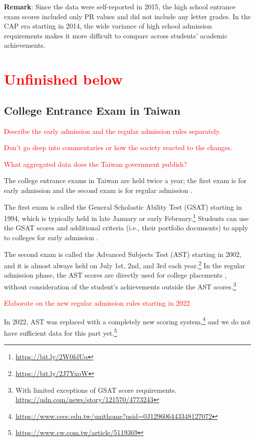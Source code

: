 \documentclass[
]{article}
\begin{document}
\textbf{Remark}: Since the data were self-reported in 2015, the high
school entrance exam scores included only PR values and did not include
any letter grades. In the CAP era starting in 2014, the wide variance of
high school admission requirements makes it more difficult to compare
across students' academic achievements.

\section*{\textcolor{red}{Unfinished below}}

\hypertarget{College_Score}{%
\subsection{College Entrance Exam in Taiwan}\label{College_Score}}

\textcolor{red}{Describe the early admission and the regular admission rules separately.}

\textcolor{red}{Don't go deep into commentaries or how the society reacted to the changes.}

\textcolor{red}{What aggregated data does the Taiwan government publish?}

The college entrance exams in Taiwan are held twice a year; the first
exam is for early admission and the second exam is for regular admission
\citep{chou2015higher}.

The first exam is called the General Scholastic Ability Test (GSAT)
starting in 1994, which is typically held in late January or early
February.\footnote{\url{https://bit.ly/2W0fdUq}} Students can use the
GSAT scores and additional criteria (i.e., their portfolio documents) to
apply to colleges for early admission \citep{hsieh2019preliminary}.

The second exam is called the Advanced Subjects Test (AST) starting in
2002, and it is almost always held on July 1st, 2nd, and 3rd each
year.\footnote{\url{https://bit.ly/2J7YxoW}} In the regular admission
phase, the AST scores are directly used for college placements
\citep{shy2021comparison}, without consideration of the student's
achievements outside the AST scores.\footnote{With limited exceptions of
  GSAT score requirements.
  \url{https://udn.com/news/story/121570/4773243}}

\textcolor{red}{Elaborate on the new regular admission rules starting in 2022}

In 2022, AST was replaced with a completely new scoring
system,\footnote{\url{https://www.ceec.edu.tw/unithome?psid=0J129606443348127072}}
and we do not have sufficient data for this part yet.\footnote{\url{https://www.cw.com.tw/article/5119369}}
\end{document}
